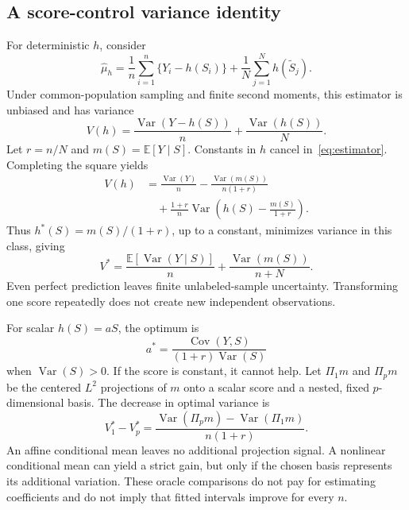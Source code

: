 \subsection{A score-control variance identity}
For deterministic $h$, consider
\begin{equation}
 \widehat\mu_h=\frac1n\sum_{i=1}^n\{Y_i-h(S_i)\}
 +\frac1N\sum_{j=1}^N h(\widetilde S_j).
 \label{eq:estimator}
\end{equation}
Under common-population sampling and finite second moments, this estimator is unbiased and has variance
\begin{equation}
 V(h)=\frac{\operatorname{Var}(Y-h(S))}{n}
       +\frac{\operatorname{Var}(h(S))}{N}.
 \label{eq:variance}
\end{equation}
Let $r=n/N$ and $m(S)=\mathbb E[Y\mid S]$. Constants in $h$ cancel in~\eqref{eq:estimator}. Completing the square yields
\begin{align}
 V(h)&=\frac{\operatorname{Var}(Y)}n
 -\frac{\operatorname{Var}(m(S))}{n(1+r)}\nonumber\\
 &\quad+\frac{1+r}{n}\operatorname{Var}\left(h(S)-\frac{m(S)}{1+r}\right).
 \label{eq:identity}
\end{align}
Thus $h^*(S)=m(S)/(1+r)$, up to a constant, minimizes variance in this class, giving
\begin{equation}
 V^*=\frac{\mathbb E[\operatorname{Var}(Y\mid S)]}{n}
        +\frac{\operatorname{Var}(m(S))}{n+N}.
 \label{eq:optimum}
\end{equation}
Even perfect prediction leaves finite unlabeled-sample uncertainty. Transforming one score repeatedly does not create new independent observations.

For scalar $h(S)=aS$, the optimum is
\begin{equation}
 a^*=\frac{\operatorname{Cov}(Y,S)}{(1+r)\operatorname{Var}(S)}
 \label{eq:scalar}
\end{equation}
when $\operatorname{Var}(S)>0$. If the score is constant, it cannot help. Let $\Pi_1m$ and $\Pi_pm$ be the centered $L^2$ projections of $m$ onto a scalar score and a nested, fixed $p$-dimensional basis. The decrease in optimal variance is
\begin{equation}
 V_1^*-V_p^*=\frac{\operatorname{Var}(\Pi_pm)-\operatorname{Var}(\Pi_1m)}{n(1+r)}.
 \label{eq:projection}
\end{equation}
An affine conditional mean leaves no additional projection signal. A nonlinear conditional mean can yield a strict gain, but only if the chosen basis represents its additional variation. These oracle comparisons do not pay for estimating coefficients and do not imply that fitted intervals improve for every $n$.

